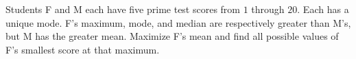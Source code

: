 Students F and M each have five prime test scores from $1$ through $20$. Each has a unique mode. F's maximum, mode, and median are respectively greater than M's, but M has the greater mean. Maximize F's mean and find all possible values of F's smallest score at that maximum.
